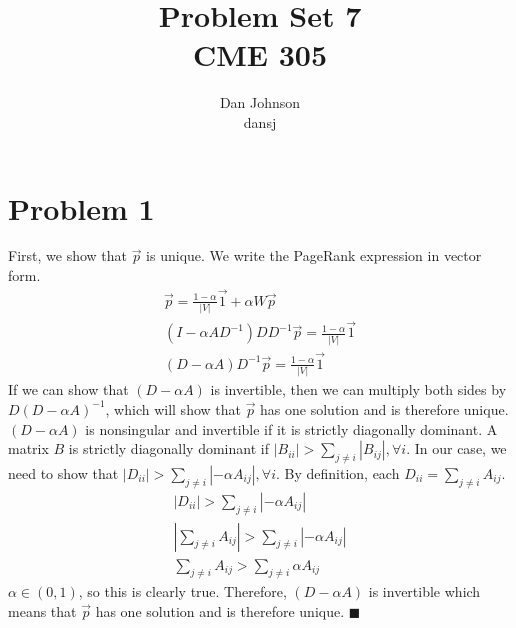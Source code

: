 \documentclass[12pt,a4paper]{article}
\author{Dan Johnson\\dansj}
\title{Problem Set 7\\CME 305}
\begin{document}


	\maketitle

	\section*{Problem 1}
	First, we show that $\vec{p}$ is unique. We write the PageRank expression in vector form.
	\begin{gather*}
		\vec{p} = \frac{1 - \alpha}{|V|} \vec{1} + \alpha W \vec{p}\\
		(I - \alpha A D^{-1}) D D^{-1} \vec{p} = \frac{1 - \alpha}{|V|} \vec{1}\\
		(D - \alpha A) D^{-1} \vec{p} = \frac{1 - \alpha}{|V|} \vec{1}
	\end{gather*}
	If we can show that $(D - \alpha A)$ is invertible, then we can multiply both sides by $D(D - \alpha A)^{-1}$, which will show that $\vec{p}$ has one solution and is therefore unique. $(D - \alpha A)$ is nonsingular and invertible if it is strictly diagonally dominant. A matrix $B$ is strictly diagonally dominant if $|B_{ii}| > \sum_{j \neq i} |B_{ij}|, \forall i$. In our case, we need to show that $|D_{ii}| > \sum_{j \neq i} |-\alpha A_{ij}|, \forall i$. By definition, each $D_{ii} = \sum_{j \neq i} A_{ij}$.
	\begin{gather*}
		|D_{ii}| > \sum_{j \neq i} |-\alpha A_{ij}|\\
		\left|\sum_{j \neq i} A_{ij}\right| > \sum_{j \neq i} |-\alpha A_{ij}|\\
		\sum_{j \neq i} A_{ij} > \sum_{j \neq i} \alpha A_{ij}
	\end{gather*}
	$\alpha \in (0, 1)$, so this is clearly true. Therefore, $(D - \alpha A)$ is invertible which means that $\vec{p}$ has one solution and is therefore unique.
	$\blacksquare$
	
\end{document}
